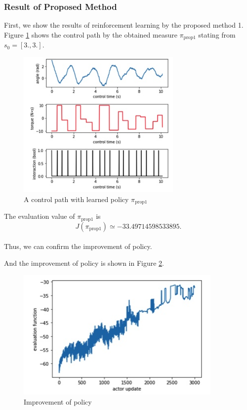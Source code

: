 \documentclass[english, dvipdfmx]{ampmt}             %
\begin{document}
\subsubsection{Result of Proposed Method}
First, we show the results of reinforcement learning by the proposed method 1. Figure \ref{proposed_1_nl} shows the control path by the obtained measure $\pi_{\textrm{prop}1}$ stating from $s_0 = [3., 3.]$.
\begin{figure}[H]
	\centering
 	\includegraphics[width=8cm]{proposed_1_nl.png}
 	\caption{A control path with learned policy $\pi_{\textrm{prop}1}$} \label{proposed_1_nl}
\end{figure}
The evaluation value of $\pi_{\textrm{prop}1}$ is
\begin{equation}
	J(\pi_{\textrm{prop}1}) \simeq -33.49714598533895.
\end{equation}\\
Thus, we can confirm the improvement of policy.\par
And the improvement of policy is shown in Figure \ref{evaluation_log_nl}.
\begin{figure}[H]
	\centering
 	\includegraphics[width=10cm]{evaluation_log_nl.png}
 	\caption{Improvement of policy} \label{evaluation_log_nl}
\end{figure}
\end{document}
